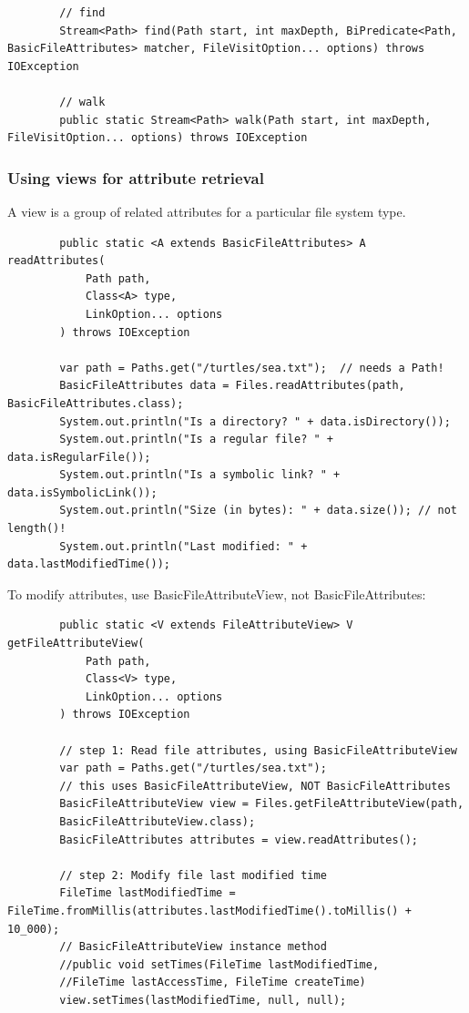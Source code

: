 \documentclass{scrartcl}
\begin{document}
    \begin{lstlisting}
        // find
        Stream<Path> find(Path start, int maxDepth, BiPredicate<Path, BasicFileAttributes> matcher, FileVisitOption... options) throws IOException

        // walk
        public static Stream<Path> walk(Path start, int maxDepth, FileVisitOption... options) throws IOException
    \end{lstlisting}

\subsubsection{Using views for attribute retrieval}

    A view is a group of related attributes for a particular file system type.

    \begin{lstlisting}
        public static <A extends BasicFileAttributes> A readAttributes(
            Path path,
            Class<A> type,
            LinkOption... options
        ) throws IOException

        var path = Paths.get("/turtles/sea.txt");  // needs a Path!
        BasicFileAttributes data = Files.readAttributes(path, BasicFileAttributes.class);
        System.out.println("Is a directory? " + data.isDirectory());
        System.out.println("Is a regular file? " + data.isRegularFile());
        System.out.println("Is a symbolic link? " + data.isSymbolicLink());
        System.out.println("Size (in bytes): " + data.size()); // not length()!
        System.out.println("Last modified: " + data.lastModifiedTime());
    \end{lstlisting}

    To modify attributes, use BasicFileAttributeView, not BasicFileAttributes:

    \begin{lstlisting}
        public static <V extends FileAttributeView> V getFileAttributeView(
            Path path,
            Class<V> type,
            LinkOption... options
        ) throws IOException

        // step 1: Read file attributes, using BasicFileAttributeView
        var path = Paths.get("/turtles/sea.txt");
        // this uses BasicFileAttributeView, NOT BasicFileAttributes
        BasicFileAttributeView view = Files.getFileAttributeView(path,
        BasicFileAttributeView.class);
        BasicFileAttributes attributes = view.readAttributes();

        // step 2: Modify file last modified time
        FileTime lastModifiedTime = FileTime.fromMillis(attributes.lastModifiedTime().toMillis() + 10_000);
        // BasicFileAttributeView instance method
        //public void setTimes(FileTime lastModifiedTime,
        //FileTime lastAccessTime, FileTime createTime)
        view.setTimes(lastModifiedTime, null, null);
    \end{lstlisting}
\end{document}
